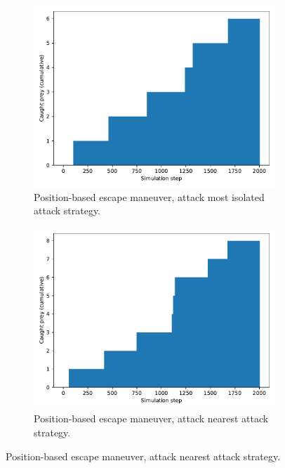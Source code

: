 \documentclass[9pt]{pnas-new}
\begin{document}
\begin{figure}[h]
    \centering
    \begin{subfigure}[t]{0.4\linewidth}
        \includegraphics[width=\linewidth]{avoid_position_attack_peripheral/predator_success_cumulative_2003.pdf}
        \caption{Position-based escape maneuver, attack most isolated attack strategy.}
    \end{subfigure}%
    \hspace{0.02\linewidth} %
    \begin{subfigure}[t]{0.4\linewidth}
        \includegraphics[width=\linewidth]{avoid_position_attack_nearest/predator_success_cumulative_2003.pdf}
        \caption{Position-based escape maneuver, attack nearest attack strategy.}

\end{subfigure}
\end{figure}
\end{document}
